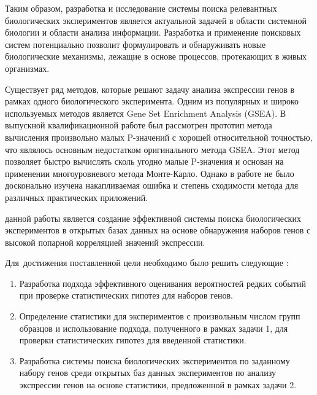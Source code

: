 Таким образом, разработка и исследование системы поиска релевантных биологических экспериментов является актуальной задачей в области системной биологии и области анализа информации. 
Разработка и применение поисковых систем потенциально позволит формулировать и обнаруживать новые биологические механизмы, лежащие в основе процессов, протекающих в живых организмах.




{\progress} Существует ряд методов, которые решают задачу анализа экспрессии генов в рамках одного биологического эксперимента.
Одним из популярных и широко используемых методов является Gene Set Enrichment Analysis (GSEA).
В выпускной квалификационной работе \cite{KorotkevichVKR} был рассмотрен прототип метода вычисления произвольно малых P-значений с хорошей относительной точностью, что являлось основным недостатком оригинального метода GSEA.
Этот метод позволяет быстро вычислять сколь угодно малые P-значения и основан на применении многоуровневого метода Монте-Карло.
Однако в работе не было досконально изучена накапливаемая ошибка и степень сходимости метода для различных практических приложений.

{\aim} данной работы является создание эффективной системы поиска биологических экспериментов в открытых базах данных на основе обнаружения наборов генов с высокой попарной корреляцией значений экспрессии.

Для~достижения поставленной цели необходимо было решить следующие {\tasks}:
\begin{enumerate}[beginpenalty=10000] %
  \item Разработка подхода эффективного оценивания вероятностей редких событий при проверке статистических гипотез для наборов генов.
  \item Определение статистики для экспериментов с произвольным числом групп образцов и использование подхода, полученного в рамках задачи 1, для проверки статистических гипотез для введенной статистики.
  \item Разработка системы поиска биологических экспериментов по заданному набору генов среди открытых баз данных экспериментов по анализу экспрессии генов на основе статистики, предложенной в рамках задачи 2.
\end{enumerate}


